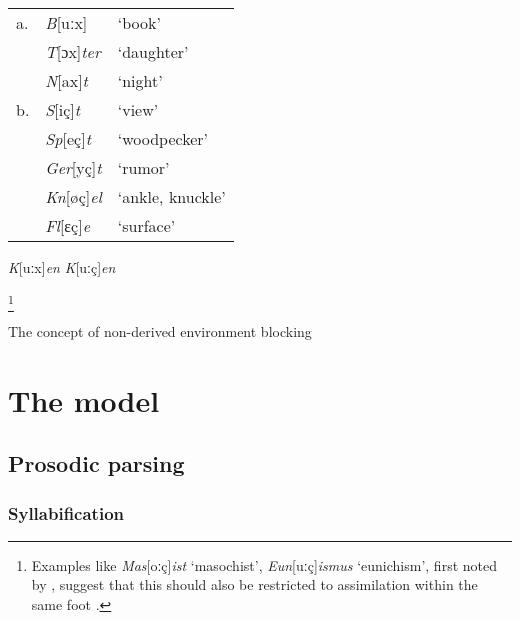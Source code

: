 \begin{example}
\begin{tabular}{l l l}
a. & \emph{B}[uːx]          & `book'           \\
   & \emph{T}[ɔx]\emph{ter} & `daughter'       \\
   & \emph{N}[ax]\emph{t}   & `night'          \\
b. & \emph{S}[iç]\emph{t}   & `view'           \\
   & \emph{Sp}[eç]\emph{t}  & `woodpecker'     \\
   & \emph{Ger}[yç]\emph{t} & `rumor'          \\
   & \emph{Kn}[øç]\emph{el} & `ankle, knuckle' \\
   & \emph{Fl}[ɛç]\emph{e}  & `surface'        \\
\end{tabular}
\end{example}


\emph{K}[uːx]\emph{en}
\emph{K}[uːç]\emph{en}

\footnote{Examples like \emph{Mas}[oːç]\emph{ist} `masochist', \emph{Eun}[uːç]\emph{ismus} `eunichism', first noted by \citet{Merchant1994}, suggest that this should also be restricted to assimilation within the same foot \citep[226f.]{Jensen2000}.}


The concept of non-derived environment blocking 

\section{The model}

\subsection{Prosodic parsing}
\subsubsection{Syllabification}
